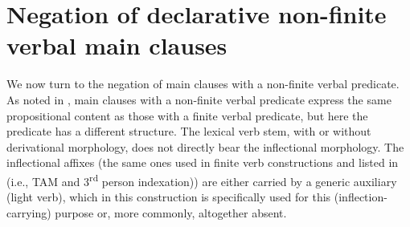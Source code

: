 \documentclass[output=paper]{langsci/langscibook}
\begin{document}
\section{Negation of declarative non-finite verbal main clauses}
\label{sec:tacana-6}

We now turn to the negation of main clauses with a non-finite verbal
predicate. As noted in , main clauses with a
non-finite verbal predicate express the same propositional content as those
with a finite verbal predicate, but here the predicate has a different
structure. The lexical verb stem, with or without derivational morphology,
does not directly bear the inflectional morphology. The inflectional
affixes (the same ones used in finite verb constructions and listed in
 (i.e., TAM and 3\textsuperscript{rd}
person indexation)) are
either carried by a generic auxiliary (light verb), which in this
construction is specifically used for this (inflection-carrying) purpose
or, more commonly, altogether absent.
\end{document}
